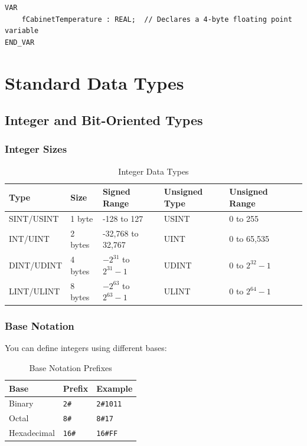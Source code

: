 \documentclass[11pt,a4paper]{article}
\begin{document}
\begin{lstlisting}
VAR
    fCabinetTemperature : REAL;  // Declares a 4-byte floating point variable
END_VAR
\end{lstlisting}

\section{Standard Data Types}

\subsection{Integer and Bit-Oriented Types}

\subsubsection{Integer Sizes}

\begin{table}[h]
\centering
\begin{tabular}{@{}llllll@{}}
\toprule
\textbf{Type} & \textbf{Size} & \textbf{Signed Range} & \textbf{Unsigned Type} & \textbf{Unsigned Range} \\
\midrule
SINT/USINT & 1 byte & -128 to 127 & USINT & 0 to 255 \\
INT/UINT & 2 bytes & -32,768 to 32,767 & UINT & 0 to 65,535 \\
DINT/UDINT & 4 bytes & $-2^{31}$ to $2^{31}-1$ & UDINT & 0 to $2^{32}-1$ \\
LINT/ULINT & 8 bytes & $-2^{63}$ to $2^{63}-1$ & ULINT & 0 to $2^{64}-1$ \\
\bottomrule
\end{tabular}
\caption{Integer Data Types}
\end{table}

\subsubsection{Base Notation}

You can define integers using different bases:

\begin{table}[h]
\centering
\begin{tabular}{@{}lll@{}}
\toprule
\textbf{Base} & \textbf{Prefix} & \textbf{Example} \\
\midrule
Binary & \texttt{2\#} & \texttt{2\#1011} \\
Octal & \texttt{8\#} & \texttt{8\#17} \\
Hexadecimal & \texttt{16\#} & \texttt{16\#FF} \\
\bottomrule
\end{tabular}
\caption{Base Notation Prefixes}
\end{table}
\end{document}
